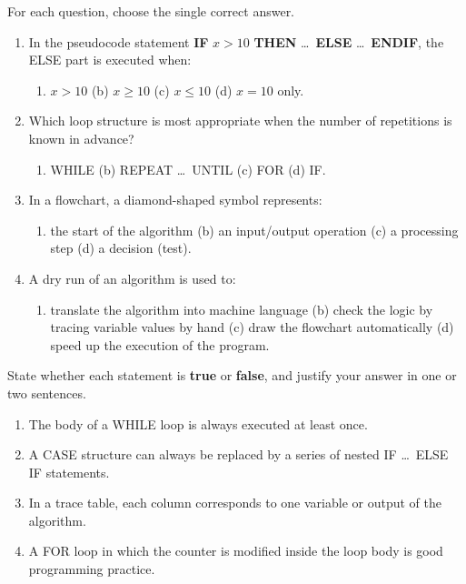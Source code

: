\documentclass[11pt]{article}
\begin{document}
\begin{exercice}
For each question, choose the single correct answer.
\begin{enumerate}
\item In the pseudocode statement \textbf{IF} $x > 10$ \textbf{THEN} \ldots\ \textbf{ELSE} \ldots\ \textbf{ENDIF}, the ELSE part is executed when:
\begin{enumerate}
\item $x > 10$ \quad (b) $x \geq 10$ \quad (c) $x \leq 10$ \quad (d) $x = 10$ only.
\end{enumerate}
\item Which loop structure is most appropriate when the number of repetitions is known in advance?
\begin{enumerate}
\item WHILE \quad (b) REPEAT \ldots\ UNTIL \quad (c) FOR \quad (d) IF.
\end{enumerate}
\item In a flowchart, a diamond-shaped symbol represents:
\begin{enumerate}
\item the start of the algorithm \quad (b) an input/output operation \quad (c) a processing step \quad (d) a decision (test).
\end{enumerate}
\item A dry run of an algorithm is used to:
\begin{enumerate}
\item translate the algorithm into machine language \quad (b) check the logic by tracing variable values by hand \quad (c) draw the flowchart automatically \quad (d) speed up the execution of the program.
\end{enumerate}
\end{enumerate}
\end{exercice}

\begin{exercice}
State whether each statement is \textbf{true} or \textbf{false}, and justify your answer in one or two sentences.
\begin{enumerate}
\item The body of a WHILE loop is always executed at least once.
\item A CASE structure can always be replaced by a series of nested IF \ldots\ ELSE IF statements.
\item In a trace table, each column corresponds to one variable or output of the algorithm.
\item A FOR loop in which the counter is modified inside the loop body is good programming practice.
\end{enumerate}
\end{exercice}
\end{document}
